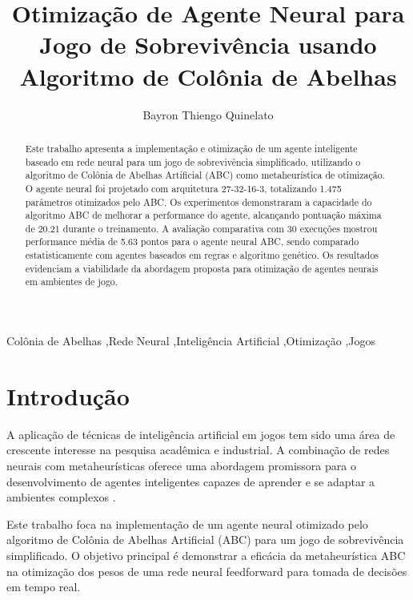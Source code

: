 \documentclass[review]{elsarticle}
\begin{document}
\begin{frontmatter}

\title{Otimização de Agente Neural para Jogo de Sobrevivência usando Algoritmo de Colônia de Abelhas}

\author{Bayron Thiengo Quinelato}
\address{Universidade Federal do Espírito Santo, Vitória, ES, Brasil}

\begin{abstract}
Este trabalho apresenta a implementação e otimização de um agente inteligente baseado em rede neural para um jogo de sobrevivência simplificado, utilizando o algoritmo de Colônia de Abelhas Artificial (ABC) como metaheurística de otimização. O agente neural foi projetado com arquitetura 27-32-16-3, totalizando 1.475 parâmetros otimizados pelo ABC. Os experimentos demonstraram a capacidade do algoritmo ABC de melhorar a performance do agente, alcançando pontuação máxima de 20.21 durante o treinamento. A avaliação comparativa com 30 execuções mostrou performance média de 5.63 pontos para o agente neural ABC, sendo comparado estatisticamente com agentes baseados em regras e algoritmo genético. Os resultados evidenciam a viabilidade da abordagem proposta para otimização de agentes neurais em ambientes de jogo.
\end{abstract}

\begin{keyword}
Colônia de Abelhas \sep Rede Neural \sep Inteligência Artificial \sep Otimização \sep Jogos
\end{keyword}

\end{frontmatter}

\linenumbers

\section{Introdução}

A aplicação de técnicas de inteligência artificial em jogos tem sido uma área de crescente interesse na pesquisa acadêmica e industrial. A combinação de redes neurais com metaheurísticas oferece uma abordagem promissora para o desenvolvimento de agentes inteligentes capazes de aprender e se adaptar a ambientes complexos \cite{karaboga2007artificial}.

Este trabalho foca na implementação de um agente neural otimizado pelo algoritmo de Colônia de Abelhas Artificial (ABC) para um jogo de sobrevivência simplificado. O objetivo principal é demonstrar a eficácia da metaheurística ABC na otimização dos pesos de uma rede neural feedforward para tomada de decisões em tempo real.
\end{document}
